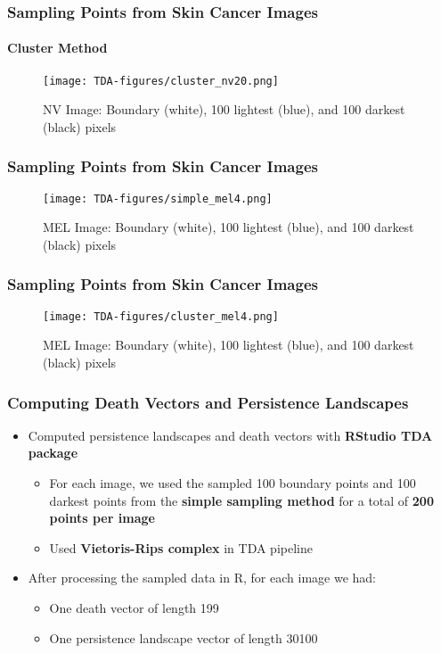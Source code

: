 \documentclass[aspectratio=169]{beamer}
\begin{document}
\begin{frame}
\frametitle{Sampling Points from Skin Cancer Images} \framesubtitle{Cluster Method}
\begin{figure}[H]
\centering
  \texttt{[image: TDA-figures/cluster\_nv20.png]}
  \caption{NV Image: Boundary (white), 100 lightest (blue), and 100 darkest (black) pixels}
\end{figure}
\end{frame}

\begin{frame}
\frametitle{Sampling Points from Skin Cancer Images} %
\begin{figure}[H]
  \centering
  \texttt{[image: TDA-figures/simple\_mel4.png]}
  \caption{MEL Image: Boundary (white), 100 lightest (blue), and 100 darkest (black) pixels}
\end{figure}
\end{frame}

\begin{frame}
\frametitle{Sampling Points from Skin Cancer Images} %
\begin{figure}[H]
\centering
  \texttt{[image: TDA-figures/cluster\_mel4.png]}
  \caption{MEL Image: Boundary (white), 100 lightest (blue), and 100 darkest (black) pixels}
\end{figure}
\end{frame}
\fi

\begin{frame}
\frametitle{Computing Death Vectors and Persistence Landscapes} %
\vspace*{-4mm}
\begin{itemize}\justifying
\item Computed persistence landscapes and death vectors with {\bfseries \textcolor{UF_dark_blue}{RStudio TDA package}}
	\begin{itemize}\justifying
	\item For each image, we used the sampled 100 boundary points and 100 darkest points from the {\bfseries \textcolor{UF_dark_blue}{simple sampling method}} for a total of {\bfseries \textcolor{UF_dark_blue}{200 points per image}}
	\item Used {\bfseries \textcolor{UF_dark_blue}{Vietoris-Rips complex}} in TDA pipeline
	\end{itemize}
\item After processing the sampled data in R, for each image we had:
	\begin{itemize}
	\item One death vector of length 199
	\item One persistence landscape vector of length 30100
	\end{itemize}
\end{itemize}
\end{frame}
\end{document}
